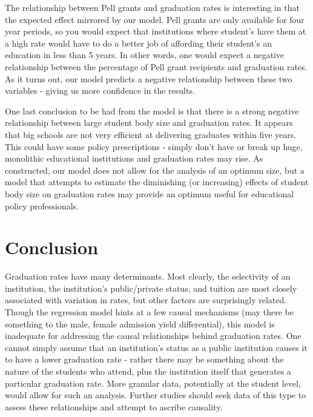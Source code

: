 \documentclass{article}
\begin{document}
The relationship between Pell grants and graduation rates is interesting in that the expected effect mirrored by our model. Pell grants are only available for four year periods, so you would expect that institutions where student's have them at a high rate would have to do a better job of affording their student's an education in less than 5 years. In other words, one would expect a negative relationship between the percentage of Pell grant recipients and graduation rates. As it turns out, our model predicts a negative relationship between these two variables - giving us more confidence in the results.

One last conclusion to be had from the model is that there is a strong negative relationship between large student body size and graduation rates. It appears that big schools are not very efficient at delivering graduates within five years. This could have some policy prescriptions - simply don't have or break up huge, monolithic educational institutions and graduation rates may rise. As constructed, our model does not allow for the analysis of an optimum size, but a model that attempts to estimate the diminishing (or increasing) effects of student body size on graduation rates may provide an optimum useful for educational policy professionals.

\section{Conclusion}

Graduation rates have many determinants. Most clearly, the selectivity of an institution, the institution's public/private status, and tuition are most closely associated with variation in rates, but other factors are surprisingly related. Though the regression model hints at a few causal mechanisms (may there be something to the male, female admission yield differential), this model is inadequate for addressing the causal relationships behind graduation rates. One cannot simply assume that an institution's status as a public institution causes it to have a lower graduation rate - rather there may be something about the nature of the students who attend, plus the institution itself that generates a particular graduation rate. More granular data, potentially at the student level, would allow for such an analysis. Further studies should seek data of this type to assess these relationships and attempt to ascribe causality.
\end{document}
